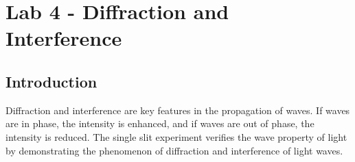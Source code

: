 \documentclass[11pt]{book}
\theoremstyle{break}
\theoremstyle{break}
\begin{document}
\newpage
\tableofcontents
{}


\setcounter{chapter}{4}
\chapter*{Lab 4 - Diffraction and Interference}
\section{Introduction}
Diffraction and interference are key features in the propagation of waves. If waves are in phase, the intensity is enhanced, and if waves are out of phase, the intensity is reduced. The single slit experiment verifies the wave property of light by demonstrating the phenomenon of diffraction and interference of light waves. \\
\end{document}
